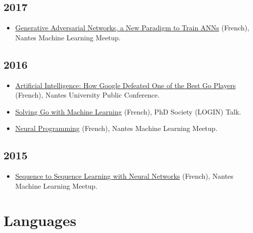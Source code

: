 \documentclass[11pt,a4paper]{moderncv}
\begin{document}
\subsection{2017}

\begin{itemize}
\item
  \href{https://www.meetup.com/Nantes-Machine-Learning-Meetup/events/239481485/}{Generative
    Adversarial Networks, a New Paradigm to Train ANNs} (French),
  Nantes Machine Learning Meetup.
\end{itemize}

\subsection{2016}

\begin{itemize}
\item \href{https://youtu.be/xv2S8A1EPqI}{Artificial Intelligence: How
    Google Defeated One of the Best Go Players} (French), Nantes
  University Public Conference.
\item \href{https://youtu.be/KuvXb2nILLc}{Solving Go with Machine
    Learning} (French), PhD Society (LOGIN) Talk.
\item
  \href{https://www.meetup.com/Nantes-Machine-Learning-Meetup/events/226648150/}{Neural
    Programming} (French), Nantes Machine Learning Meetup.
\end{itemize}

\subsection{2015}

\begin{itemize}
\item
  \href{https://www.meetup.com/Nantes-Machine-Learning-Meetup/events/221108033/}{Sequence
    to Sequence Learning with Neural Networks} (French), Nantes
  Machine Learning Meetup.
\end{itemize}

\section{Languages}
\end{document}
